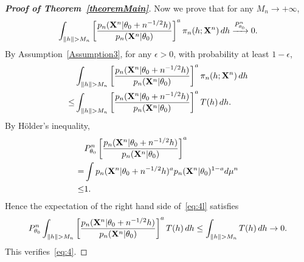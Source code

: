 \documentclass[11pt]{article}
\theoremstyle{plain}
\theoremstyle{definition}
\theoremstyle{remark}
\begin{document}
\begin{appendices}
\begin{proof}[\textbf{Proof of Theorem~\ref{theoremMain}}]
Now we prove that for any $M_n\to +\infty$,
\begin{equation}\label{eq:4}
    \int_{\|h\|> M_n}\left[\frac{p_n(\BX^{n}|\theta_0+n^{-1/2}h)}{p_n(\BX^{n}|\theta_0)}\right]^{a} \pi_n(h;\BX^{n})\, dh
    \xrightarrow{P_{\theta_0}^n}0.
\end{equation}
By Assumption~\ref{Assumption3}, for any $\epsilon>0$, with probability at least $1-\epsilon$,
\begin{equation}\label{eq:4l}
    \begin{split}
    &\int_{\|h\|> M_n}\left[\frac{p_n(\BX^{n}|\theta_0+n^{-1/2}h)}{p_n(\BX^{n}|\theta_0)}\right]^{a} \pi_n(h;\BX^{n})\, dh
    \\
    \leq&
    \int_{\|h\|> M_n}\left[\frac{p_n(\BX^{n}|\theta_0+n^{-1/2}h)}{p_n(\BX^{n}|\theta_0)}\right]^{a} T(h)\, dh.
    \end{split}
\end{equation}
By  H\"older's inequality, 
\begin{equation*}
    \begin{split}
    &P^n_{\theta_0}\left[\frac{p_n(\mathbf{X}^{n}|\theta_0+n^{-1/2}h)}{p_n(\mathbf{X}^{n}|\theta_0)}\right]^{a}
    \\
    =&
    \int p_n(\mathbf{X}^{n}|\theta_0+n^{-1/2}h)^a p_n(\mathbf{X}^{n}|\theta_0)^{1-a} d\mu^n
    \\
    \leq& 1.
    \end{split}
\end{equation*}
Hence the expectation of the right hand side of~\eqref{eq:4l} satisfies
\begin{equation*}
   P^n_{\theta_0} \int_{\|h\|> M_n}\left[\frac{p_n(\BX^{n}|\theta_0+n^{-1/2}h)}{p_n(\BX^{n}|\theta_0)}\right]^{a} T(h)\, dh
   \leq
   \int_{\|h\|> M_n} T(h)\, dh\to 0.
\end{equation*}
This verifies~\eqref{eq:4}.


\end{proof}
\end{appendices}
\end{document}
